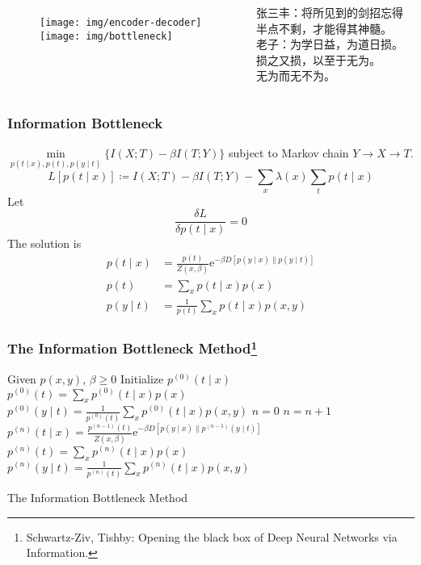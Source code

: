\documentclass[UTF8,11pt,colorlinks,compress,openany]{beamer}%
\begin{document}
\begin{frame}\frametitle{}\vspace{-1ex}
\begin{columns}
\begin{figure}[H]
\texttt{[image: img/encoder-decoder]}
\texttt{[image: img/bottleneck]}
\end{figure}
张三丰：将所见到的剑招忘得半点不剩，才能得其神髓。\\
\vspace*{2ex}
老子：为学日益，为道日损。\\损之又损，以至于无为。\\无为而无不为。
\end{columns}
\end{frame}

\begin{frame}\frametitle{Information Bottleneck}
$\min\limits_{p(t\mid x),p(t),p(y\mid t)}\Big\{I(X;T)-\beta I(T;Y)\Big\}$ subject to Markov chain $Y\to X\to T$.
\[L[p(t\mid x)]\coloneqq I(X;T)-\beta I(T;Y)-\sum\limits_x\lambda(x)\sum\limits_t p(t\mid x)\]
Let
\[\frac{\delta L}{\delta p(t\mid x)}=0\]
The solution is
\begin{align*}
p(t\mid x)&=\frac{p(t)}{Z(x,\beta)}\mathrm{e}^{-\beta D[p(y\mid x)\|p(y\mid t)]}\\
p(t)&=\sum\limits_x p(t\mid x)p(x)\\
p(y\mid t)&=\frac{1}{p(t)}\sum\limits_x p(t\mid x)p(x,y)
\end{align*}
\end{frame}

\begin{frame}\frametitle{The Information Bottleneck Method\footnote{\tiny Schwartz-Ziv, Tishby: Opening the black box of Deep Neural Networks via Information.}}
\begin{algorithm}[H]
\begin{algorithmic}[1]
\State Given $p(x,y)$, $\beta \geq 0$
\State Initialize $p^{(0)}(t\mid x)$
\State $p^{(0)}(t)=\sum_x p^{(0)}(t\mid x)p(x)$
\State $p^{(0)}(y\mid t)=\frac{1}{p^{(0)}(t)}\sum_x p^{(0)}(t\mid x)p(x,y)$
\State $n=0$
\State $n=n+1$
\State $p^{(n)}(t\mid x)=\frac{p^{(n-1)}(t)}{Z(x,\beta)}\mathrm{e}^{-\beta D\left[p(y\mid x)\| p^{(n-1)}(y\mid t)\right]}$
\State $p^{(n)}(t)=\sum_x p^{(n)}(t\mid x)p(x)$
\State $p^{(n)}(y\mid t)=\frac{1}{p^{(n)}(t)}\sum_x p^{(n)}(t\mid x)p(x,y)$
\EndWhile
\end{algorithmic}\caption{The Information Bottleneck Method}
\end{algorithm}
\end{frame}
\end{document}
